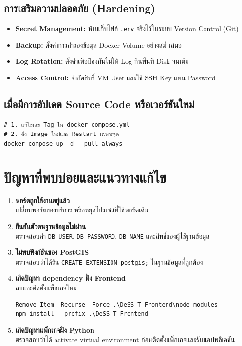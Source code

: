 \subsection{การเสริมความปลอดภัย (Hardening)}
\begin{itemize}
    \item \textbf{Secret Management:} ห้ามเก็บไฟล์ \texttt{.env} จริงไว้ในระบบ Version Control (Git)
    \item \textbf{Backup:} ตั้งค่าการสำรองข้อมูล Docker Volume อย่างสม่ำเสมอ
    \item \textbf{Log Rotation:} ตั้งค่าเพื่อป้องกันไม่ให้ Log กินพื้นที่ Disk จนเต็ม
    \item \textbf{Access Control:} จำกัดสิทธิ์ VM User และใช้ SSH Key แทน Password
\end{itemize}

\subsection{เมื่อมีการอัปเดต Source Code หรือเวอร์ชันใหม่}
\begin{verbatim}
# 1. แก้ไขเลข Tag ใน docker-compose.yml
# 2. ดึง Image ใหม่และ Restart เฉพาะจุด
docker compose up -d --pull always
\end{verbatim}

\section{ปัญหาที่พบบ่อยและแนวทางแก้ไข}
\begin{enumerate}
    \item \textbf{พอร์ตถูกใช้งานอยู่แล้ว} \\
    เปลี่ยนพอร์ตของบริการ หรือหยุดโปรเซสที่ใช้พอร์ตเดิม

    \item \textbf{ยืนยันตัวตนฐานข้อมูลไม่ผ่าน} \\
    ตรวจสอบค่า \texttt{DB\_USER}, \texttt{DB\_PASSWORD}, \texttt{DB\_NAME} และสิทธิ์ของผู้ใช้ฐานข้อมูล

    \item \textbf{ไม่พบฟังก์ชันของ PostGIS} \\
    ตรวจสอบว่าได้รัน \texttt{CREATE EXTENSION postgis;} ในฐานข้อมูลที่ถูกต้อง

    \item \textbf{เกิดปัญหา dependency ฝั่ง Frontend} \\
    ลบและติดตั้งแพ็กเกจใหม่
\begin{verbatim}
Remove-Item -Recurse -Force .\DeSS_T_Frontend\node_modules
npm install --prefix .\DeSS_T_Frontend
\end{verbatim}

    \item \textbf{เกิดปัญหาแพ็กเกจฝั่ง Python} \\
    ตรวจสอบว่าได้ activate virtual environment ก่อนติดตั้งแพ็กเกจและรันแอปพลิเคชัน
\end{enumerate}

